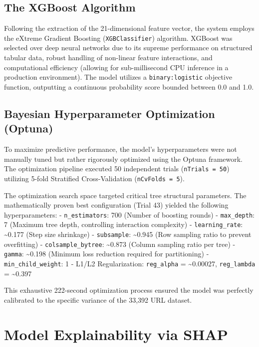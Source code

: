 \subsection{The XGBoost Algorithm}\label{the-xgboost-algorithm}

Following the extraction of the 21-dimensional feature vector, the
system employs the eXtreme Gradient Boosting (\texttt{XGBClassifier})
algorithm. XGBoost was selected over deep neural networks due to its
supreme performance on structured tabular data, robust handling of
non-linear feature interactions, and computational efficiency (allowing
for sub-millisecond CPU inference in a production environment). The
model utilizes a \texttt{binary:logistic} objective function, outputting
a continuous probability score bounded between 0.0 and 1.0.

\subsection{Bayesian Hyperparameter Optimization
(Optuna)}\label{bayesian-hyperparameter-optimization-optuna}

To maximize predictive performance, the model's hyperparameters were not
manually tuned but rather rigorously optimized using the Optuna
framework. The optimization pipeline executed 50 independent trials
(\texttt{nTrials\ =\ 50}) utilizing 5-fold Stratified Cross-Validation
(\texttt{nCvFolds\ =\ 5}).

The optimization search space targeted critical tree structural
parameters. The mathematically proven best configuration (Trial 43)
yielded the following hyperparameters: - \texttt{n\_estimators}: 700
(Number of boosting rounds) - \texttt{max\_depth}: 7 (Maximum tree
depth, controlling interaction complexity) - \texttt{learning\_rate}:
\textasciitilde0.177 (Step size shrinkage) - \texttt{subsample}:
\textasciitilde0.945 (Row sampling ratio to prevent overfitting) -
\texttt{colsample\_bytree}: \textasciitilde0.873 (Column sampling ratio
per tree) - \texttt{gamma}: \textasciitilde0.198 (Minimum loss reduction
required for partitioning) - \texttt{min\_child\_weight}: 1 - L1/L2
Regularization: \texttt{reg\_alpha} = \textasciitilde0.00027,
\texttt{reg\_lambda} = \textasciitilde0.397

This exhaustive 222-second optimization process ensured the model was
perfectly calibrated to the specific variance of the 33,392 URL dataset.

\section{Model Explainability via
SHAP}\label{model-explainability-via-shap}

